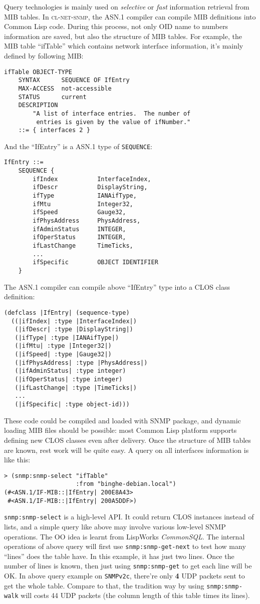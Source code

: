 \documentclass[reprint,9pt]{sigplanconf}
\begin{document}
Query technologies is mainly used on \textsl{selective} or
\textsl{fast} information retrieval from MIB tables.
In \textsc{cl-net-snmp}, the ASN.1 compiler can compile MIB definitions
into Common Lisp code. During this process, not only OID name to numbers
information are saved, but also the structure of MIB tables. For example,
the MIB table ``ifTable'' which contains network interface information,
it's mainly defined by following MIB:
\begin{verbatim}
ifTable OBJECT-TYPE
    SYNTAX      SEQUENCE OF IfEntry
    MAX-ACCESS  not-accessible
    STATUS      current
    DESCRIPTION
        "A list of interface entries.  The number of
         entries is given by the value of ifNumber."
    ::= { interfaces 2 }
\end{verbatim}
And the ``IfEntry'' is a ASN.1 type of \texttt{SEQUENCE}:
\begin{verbatim}
IfEntry ::=
    SEQUENCE {
        ifIndex           InterfaceIndex,
        ifDescr           DisplayString,
        ifType            IANAifType,
        ifMtu             Integer32,
        ifSpeed           Gauge32,
        ifPhysAddress     PhysAddress,
        ifAdminStatus     INTEGER,
        ifOperStatus      INTEGER,
        ifLastChange      TimeTicks,
        ...
        ifSpecific        OBJECT IDENTIFIER
    }
\end{verbatim}
The ASN.1 compiler can compile above ``IfEntry'' type into a CLOS class definition:
\begin{verbatim}
(defclass |IfEntry| (sequence-type)
  ((|ifIndex| :type |InterfaceIndex|)
   (|ifDescr| :type |DisplayString|)
   (|ifType| :type |IANAifType|)
   (|ifMtu| :type |Integer32|)
   (|ifSpeed| :type |Gauge32|)
   (|ifPhysAddress| :type |PhysAddress|)
   (|ifAdminStatus| :type integer)
   (|ifOperStatus| :type integer)
   (|ifLastChange| :type |TimeTicks|)
   ...
   (|ifSpecific| :type object-id)))
\end{verbatim}
These code could be compiled and loaded with SNMP package, and
dynamic loading MIB files should be possible: most Common Lisp platform
supports defining new CLOS classes even after delivery.
Once the structure of MIB tables are known, rest work will be quite easy.
A query on all interfaces information is like this:
\begin{verbatim}
> (snmp:snmp-select "ifTable"
                    :from "binghe-debian.local")
(#<ASN.1/IF-MIB::|IfEntry| 200E8A43>
 #<ASN.1/IF-MIB::|IfEntry| 200A5DDF>)
\end{verbatim}
\texttt{snmp:snmp-select} is a high-level API. It could return CLOS instances
instead of lists, and a simple query like above may involve various low-level
SNMP operations. The OO idea is learnt from LispWorks
\textsl{CommonSQL}.
The internal operations of above query will first use
\texttt{snmp:snmp-get-next} to test how many ``lines'' does the table have.
In this example, it has just two lines. Once the number of lines is known,
then just using \texttt{snmp:snmp-get} to get each line will be OK. In above
query example on \texttt{SNMPv2c}, there're only \textbf{4} UDP packets sent
to get the whole table. Compare to that, the tradition way
by using \texttt{snmp:snmp-walk} will costs 44 UDP packets (the column length
of this table times its lines).
\end{document}

